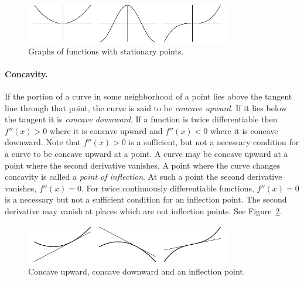 \begin{figure}[h!]
  \begin{center}
    \includegraphics[width=0.8\textwidth]{calculus/differential/minmaxno}
  \end{center}
  \caption{Graphs of functions with stationary points.}
  \label{maxminno}
\end{figure}




\paragraph{Concavity.}
If the portion of a curve in some neighborhood of a point lies above the
tangent line through that point, the curve is said to be \textit{concave
  upward}.  If it lies below the tangent it is \textit{concave downward}.
If a function is twice differentiable then $f''(x) > 0$ where it is
concave upward and $f''(x) < 0$ where it is concave downward.
Note that $f''(x) > 0$ is a sufficient, but not a necessary condition
for a curve to be concave upward at a point.  A curve may be concave 
upward at a point where the second derivative vanishes.
A point where the curve changes concavity is called a \textit{point of
  inflection}.  At such a point the second derivative vanishes, 
$f''(x) = 0$.  For twice continuously differentiable functions, $f''(x) = 0$
is a necessary but not a sufficient condition for an inflection point.
The second derivative may vanish at places which are not inflection points.
See Figure~\ref{concave}.

\begin{figure}[h!]
  \begin{center}
    \includegraphics[width=0.8\textwidth]{calculus/differential/concave}
  \end{center}
  \caption{Concave upward, concave downward and an inflection point.}
  \label{concave}
\end{figure}






